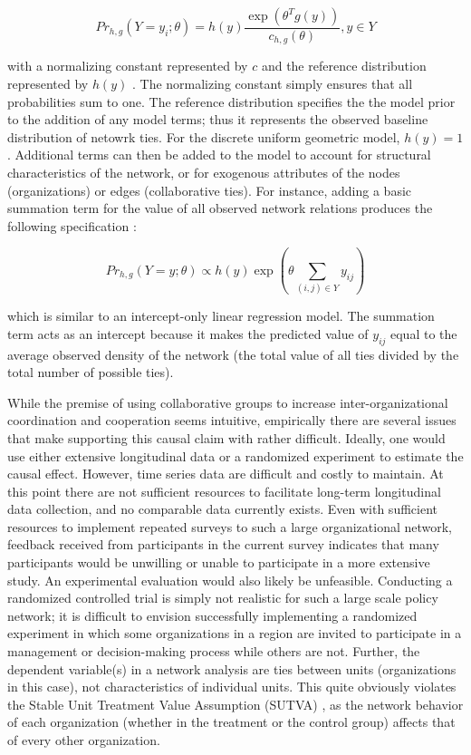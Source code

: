 \documentclass[12pt,a4paper,titlepage]{article}
\begin{document}
\begin{equation}
Pr_{h,g}(Y=y_{i};\theta)= h(y) \frac{\exp(\theta^{T}g(y))}{c_{h,g}(\theta)}, y \in Y
\label{eq:ERGM}
\end{equation}

with a normalizing constant represented by $c$ and the reference distribution represented by $h(y)$ \parencite{krivitsky2013}. The normalizing constant simply ensures that all probabilities sum to one. The reference distribution specifies the the model prior to the addition of any model terms; thus it represents the observed baseline distribution of netowrk ties. For the discrete uniform geometric model, $h(y) = 1$ \parencite{krivitsky2012}. Additional terms can then be added to the model to account for structural characteristics of the network, or for exogenous attributes of the nodes (organizations) or edges (collaborative ties). For instance, adding a basic summation term for the value of all observed network relations produces the following specification \parencite{krivitsky2013}:

\begin{equation}
Pr_{h,g} (Y = y; \theta) \propto h(y) \exp(\theta \sum_{(i,j) \in Y} y_{ij})
\label{eq:Term}
\end{equation}

which is similar to an intercept-only linear regression model. The summation term acts as an intercept because it makes the predicted value of $y_{ij}$ equal to the average observed density of the network (the total value of all ties divided by the total number of possible ties).

While the premise of using collaborative groups to increase inter-organizational coordination and cooperation seems intuitive, empirically there are several issues that make supporting this causal claim with rather difficult. Ideally, one would use either extensive longitudinal data or a randomized experiment to estimate the causal effect. However, time series data are difficult and costly to maintain. At this point there are not sufficient resources to facilitate long-term longitudinal data collection, and no comparable data currently exists. Even with sufficient resources to implement repeated surveys to such a large organizational network, feedback received from participants in the current survey indicates that many participants would be unwilling or unable to participate in a more extensive study. An experimental evaluation would also likely be unfeasible. Conducting a randomized controlled trial is simply not realistic for such a large scale policy network; it is difficult to envision successfully implementing a randomized experiment in which some organizations in a region are invited to participate in a management or decision-making process while others are not. Further, the dependent variable(s) in a network analysis are ties between units (organizations in this case), not characteristics of individual units. This quite obviously violates the Stable Unit Treatment Value Assumption (SUTVA) \parencite{rubin1986, pearl2000}, as the network behavior of each organization (whether in the treatment or the control group) affects that of every other organization.
\end{document}
